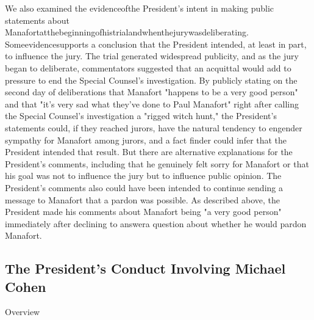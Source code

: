 We also examined the evidenceofthe President's intent in making public statements about Manafortatthebeginningofhistrialandwhenthejurywasdeliberating. Someevidencesupports a conclusion that the President intended, at least in part, to influence the jury.
The trial generated widespread publicity, and as the jury began to deliberate, commentators suggested that an acquittal would add to pressure to end the Special Counsel's investigation.
By publicly stating on the second day of deliberations that Manafort "happens to be a very good person" and that "it's very sad what they've done to Paul Manafort" right after calling the Special Counsel's investigation a "rigged witch hunt," the President's statements could, if they reached jurors, have the natural tendency to engender sympathy for Manafort among jurors, and a fact finder could infer that the President intended that result.
But there are alternative explanations for the President's comments, including that he genuinely felt sorry for Manafort or that his goal was not to influence the jury but to influence public opinion.
The President's comments also could have been intended to continue sending a message to Manafort that a pardon was possible.
As described above, the President made his comments about Manafort being "a very good person" immediately after declining to answera question about whether he would pardon Manafort.


\subsection{The President's Conduct Involving Michael Cohen}

Overview

